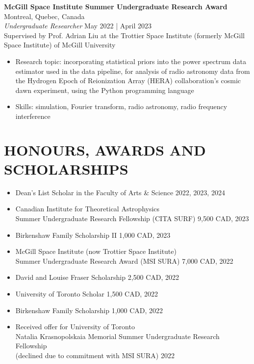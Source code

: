 \documentclass[a4paper,10pt]{extarticle}
\begin{document}
 
\textbf{McGill Space Institute Summer Undergraduate Research Award} \hfill Montreal, Quebec, Canada\\
\textit{Undergraduate Researcher} \hfill May 2022 | April 2023\\
Supervised by Prof. Adrian Liu at the Trottier Space Institute (formerly McGill Space Institute) of McGill University
\begin{itemize}
    \item Research topic: incorporating statistical priors into the power spectrum data estimator used in the data pipeline, for analysis of radio astronomy data from the Hydrogen Epoch of Reionization Array (HERA) collaboration's cosmic dawn experiment, using the Python programming language

    \item Skills: simulation, Fourier transform, radio astronomy, radio frequency interference
\end{itemize}


\newpage
\section*{HONOURS, AWARDS AND SCHOLARSHIPS}
\begin{itemize}
    \item Dean's List Scholar in the Faculty of Arts \& Science \hfill 2022, 2023, 2024

    \item Canadian Institute for Theoretical Astrophysics \\
    Summer Undergraduate Research Fellowship (CITA SURF) \hfill 9,500 CAD, 2023
    
    \item Birkenshaw Family Scholarship II \hfill 1,000 CAD, 2023

    \item McGill Space Institute (now Trottier Space Institute) \\Summer Undergraduate Research Award (MSI SURA) \hfill 7,000 CAD, 2022

    \item David and Louise Fraser Scholarship \hfill 2,500 CAD, 2022

    \item University of Toronto Scholar \hfill 1,500 CAD, 2022

    \item Birkenshaw Family Scholarship \hfill 1,000 CAD, 2022

    \item Received offer for University of Toronto \\Natalia Krasnopolskaia Memorial Summer Undergraduate Research Fellowship \\(declined due to commitment with MSI SURA) \hfill 2022
\end{itemize}
\end{document}
